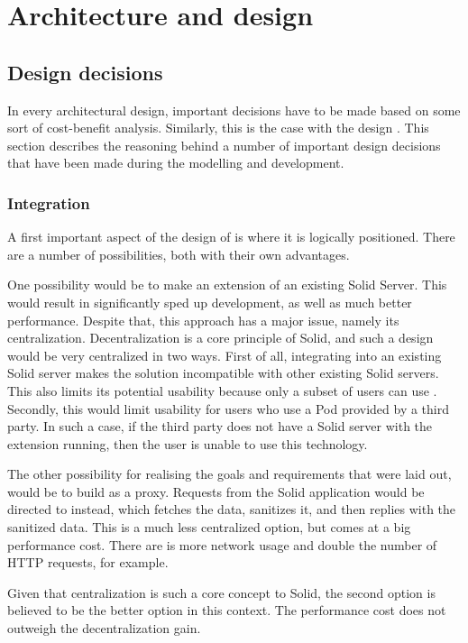 \chapter{Architecture and design}
\section{Design decisions}
In every architectural design, important decisions have to be made based on some sort of cost-benefit analysis. Similarly, this is the case with the design \middleware{}. This section describes the reasoning behind a number of important design decisions that have been made during the modelling and development.

\subsection{Integration}
A first important aspect of the design of \middleware{} is where it is logically positioned. There are a number of possibilities, both with their own advantages. 

One possibility would be to make \middleware{} an extension of an existing Solid Server. This would result in significantly sped up development, as well as much better performance. Despite that, this approach has a major issue, namely its centralization. Decentralization is a core principle of Solid, and such a design would be very centralized in two ways. First of all, integrating into an existing Solid server makes the solution incompatible with other existing Solid servers. This also limits its potential usability because only a subset of users can use \middleware{}. Secondly, this would limit usability for users who use a Pod provided by a third party. In such a case, if the third party does not have a Solid server with the \middleware{} extension running, then the user is unable to use this technology. 

The other possibility for realising the goals and requirements that were laid out, would be to build \middleware{} as a proxy. Requests from the Solid application would be directed to \middleware{} instead, which fetches the data, sanitizes it, and then replies with the sanitized data. This is a much less centralized option, but comes at a big performance cost. There are is more network usage and double the number of HTTP requests, for example. 

Given that centralization is such a core concept to Solid, the second option is believed to be the better option in this context. The performance cost does not outweigh the decentralization gain.

